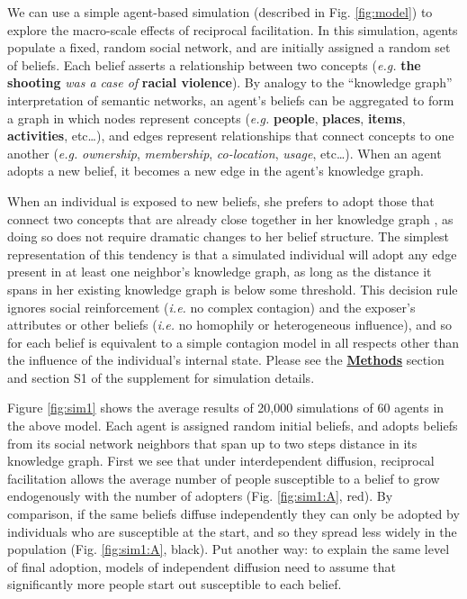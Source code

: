 \documentclass[9pt,twocolumn,twoside,lineno]{pnas-new}
\begin{document}
We can use a simple agent-based simulation (described in Fig. \ref{fig:model}) to explore the macro-scale effects of reciprocal facilitation. 
In this simulation, agents populate a fixed, random social network, and are initially assigned a random set of beliefs. Each belief asserts a relationship between two concepts (\textit{e.g.} \textbf{the shooting} \textit{was a case of} \textbf{racial violence}). By analogy to the ``knowledge graph'' interpretation of semantic networks\cite{sowa1987semantic, collins1975spreading, popping2003knowledge}, an agent's beliefs can be aggregated to form a graph in which nodes represent concepts (\textit{e.g.} \textbf{people}, \textbf{places}, \textbf{items}, \textbf{activities}, etc\ldots), and edges represent relationships that connect concepts to one another (\textit{e.g.} \textit{ownership}, \textit{membership}, \textit{co-location}, \textit{usage}, etc\ldots). When an agent adopts a new belief, it becomes a new edge in the agent's knowledge graph.

When an individual is exposed to new beliefs, she prefers to adopt those that connect two concepts that are already close together in her knowledge graph \cite{schilling2005small,nickerson1998confirmation}, as doing so does not require dramatic changes to her belief structure. The simplest representation of this tendency is that a simulated individual will adopt any edge present in at least one neighbor's knowledge graph, as long as the distance it spans in her existing knowledge graph is below some threshold. This decision rule ignores social reinforcement (\textit{i.e.} no complex contagion) and the exposer's attributes or other beliefs (\textit{i.e.} no homophily or heterogeneous influence), and so for each belief is equivalent to a simple contagion model in all respects other than the influence of the individual's internal state. Please see the \hyperref[methods]{\textbf{Methods}} section and section S1 of the supplement for simulation details.

Figure \ref{fig:sim1} shows the average results of 20,000 simulations of 60 agents in the above model. Each agent is assigned random initial beliefs, and adopts beliefs from its social network neighbors that span up to two steps distance in its knowledge graph. First we see that under interdependent diffusion, reciprocal facilitation allows the average number of people susceptible to a belief to grow endogenously with the number of adopters (Fig. \ref{fig:sim1:A}, red). By comparison, if the same beliefs diffuse independently they can only be adopted by individuals who are susceptible at the start, and so they spread less widely in the population (Fig. \ref{fig:sim1:A}, black). Put another way: to explain the same level of final adoption, models of independent diffusion need to assume that significantly more people start out susceptible to each belief. 
\end{document}
